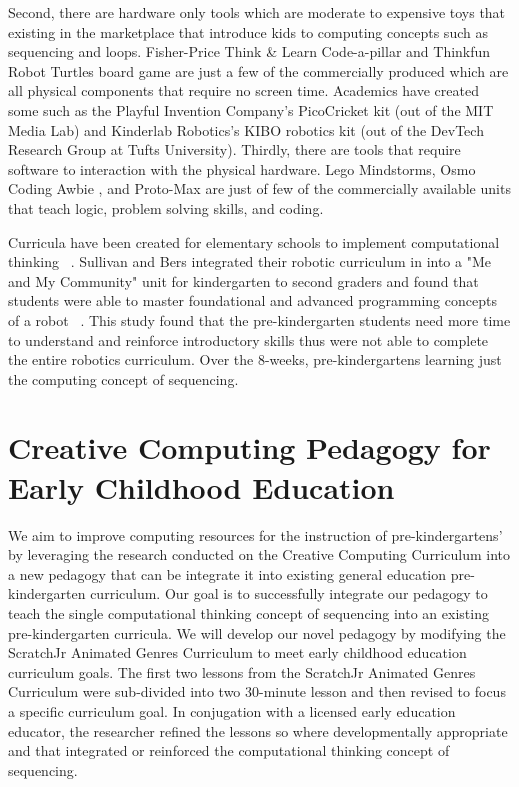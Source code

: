 \documentclass[11pt, letterpaper, onecolumn]{article}
\begin{document}
%
Second, there are hardware only tools which are moderate to expensive toys that existing in the marketplace that introduce kids to computing concepts such as sequencing and loops. 
%
Fisher-Price Think \& Learn Code-a-pillar  and Thinkfun Robot Turtles board game are just a few of the commercially produced which are all physical components that require no screen time. 
%
Academics have created some such as the Playful Invention Company's PicoCricket kit (out of the MIT Media Lab) and Kinderlab Robotics's KIBO robotics kit (out of the DevTech Research Group at Tufts University). 
%
Thirdly, there are tools that require software to interaction with the physical hardware. 
%
Lego Mindstorms, Osmo Coding Awbie , and Proto-Max are just of few of the commercially available units that teach logic, problem solving skills, and coding.
%

%
Curricula have been created for elementary schools to implement computational thinking ~\cite{Grover2013EduResearcher,Rich2017ICER,brennan2012aera}. 
%
Sullivan and Bers integrated their robotic curriculum in into a "Me and My Community" unit for kindergarten to second graders and found that students were able to master foundational and advanced programming concepts of a robot ~\cite{sullivan2015ijde}. 
%
This study found that the pre-kindergarten students need more time to understand and reinforce introductory skills thus were not able to complete the entire robotics curriculum.
%
Over the 8-weeks, pre-kindergartens learning just the computing concept of sequencing.
%


\section{Creative Computing Pedagogy for Early Childhood Education}
%
We aim to improve computing resources for the instruction of pre-kindergartens' by leveraging the research conducted on the Creative Computing Curriculum into a new pedagogy that can be integrate it into existing general education pre-kindergarten curriculum.
%
Our goal is to successfully integrate our pedagogy to teach the single computational thinking concept of sequencing into an existing pre-kindergarten curricula.
%
%
We will develop our novel pedagogy by modifying the ScratchJr Animated Genres Curriculum to meet early childhood education curriculum goals.
%
The first two lessons from the ScratchJr Animated Genres Curriculum were sub-divided into two 30-minute lesson and then revised to focus a specific curriculum goal.
%
In conjugation with a licensed early education educator, the researcher refined the lessons so where developmentally appropriate and that integrated or reinforced the computational thinking concept of sequencing.
\end{document}
